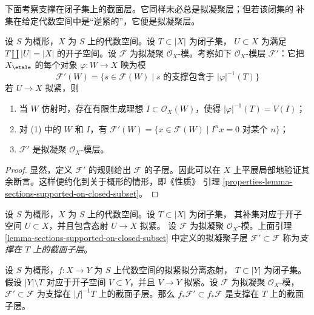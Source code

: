 \noindent
下面考察支撑在闭子集上的截面层。它同样未必总是拟凝聚层；但若该闭集的
补集在给定代数空间中是``逆紧的''，它便是拟凝聚层。

\begin{lemma}
\label{lemma-sections-supported-on-closed-subset}
设 $S$ 为概形，$X$ 为 $S$ 上的代数空间。设 $T \subset |X|$ 为闭子集，
$U \subset X$ 为满足 $T \amalg |U| = |X|$ 的开子空间。设
$\mathcal{F}$ 为拟凝聚 $\mathcal{O}_X$-模。考察如下
$\mathcal{O}_X$-模层 $\mathcal{F}'$：它把 $X_\etale$ 的每个对象
$\varphi : W \to X$ 映为模
$$
\mathcal{F}'(W)
=
\{s \in \mathcal{F}(W) \mid
s\text{ 的支撑包含于 }|\varphi|^{-1}(T)\}
$$
若 $U \to X$ 拟紧，则
\begin{enumerate}
\item 当 $W$ 仿射时，存在有限生成理想
$I \subset \mathcal{O}_X(W)$，使得 $|\varphi|^{-1}(T) = V(I)$；
\item 对 (1) 中的 $W$ 和 $I$，有
$\mathcal{F}'(W) = \{x \in \mathcal{F}(W) \mid
I^nx = 0 \text{ 对某个 } n\}$；
\item $\mathcal{F}'$ 是拟凝聚 $\mathcal{O}_X$-模层。
\end{enumerate}
\end{lemma}

\begin{proof}
显然，定义 $\mathcal{F}'$ 的规则给出 $\mathcal{F}$ 的子层。因此可以在
$X$ 上平展局部地验证其余断言。这样便约化到关于概形的情形，即《性质》
引理 \ref{properties-lemma-sections-supported-on-closed-subset}。
\end{proof}

\begin{definition}
\label{definition-subsheaf-sections-supported-on-closed}
设 $S$ 为概形，$X$ 为 $S$ 上的代数空间。设 $T \subset |X|$ 为闭子集，
其补集对应于开子空间 $U \subset X$，并且包含态射 $U \to X$ 拟紧。
设 $\mathcal{F}$ 为拟凝聚 $\mathcal{O}_X$-模。上面引理
\ref{lemma-sections-supported-on-closed-subset} 中定义的拟凝聚子层
$\mathcal{F}' \subset \mathcal{F}$ 称为{\it 支撑在 $T$ 上的截面子层}。
\end{definition}

\begin{lemma}
\label{lemma-push-sections-supported-on-closed-subset}
设 $S$ 为概形，$f : X \to Y$ 为 $S$ 上代数空间的拟紧拟分离态射，
$T \subset |Y|$ 为闭子集。假设 $|Y| \setminus T$ 对应于开子空间
$V \subset Y$，并且 $V \to Y$ 拟紧。设 $\mathcal{F}$ 为拟凝聚
$\mathcal{O}_X$-模，$\mathcal{F}' \subset \mathcal{F}$ 为支撑在
$|f|^{-1}T$ 上的截面子层。那么
$f_*\mathcal{F}' \subset f_*\mathcal{F}$ 是支撑在 $T$ 上的截面子层。
\end{lemma}

